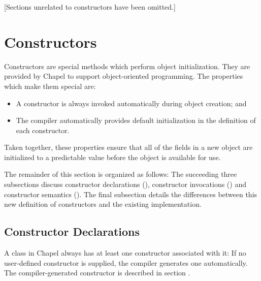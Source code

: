 

\label{Classes}

[Sections unrelated to constructors have been omitted.]

\section{Constructors}
\label{Constructors}

Constructors are special methods which perform object initialization.  They are
provided by Chapel to support object-oriented programming.  The
properties which make them special are:
\begin{itemize}
\item A constructor is always invoked automatically during object creation; and
\item The compiler automatically provides default initialization in the
definition of each constructor.
\end{itemize}
\noindent
Taken together, these properties ensure that all of the fields in a new object are
initialized to a predictable value before the object is available for use.

The remainder of this section is organized as follows: The succeeding three
subsections discuss constructor declarations (),
constructor invocations () and constructor
semantics ().  The final subsection
details the differences between this new definition of constructors and the
existing implementation.

\subsection{Constructor Declarations}
\label{Constructor_Declarations}

A class in Chapel always has at least one constructor associated with it: If no
user-defined constructor is supplied, the compiler generates one automatically.
The compiler-generated constructor is described in
section .

